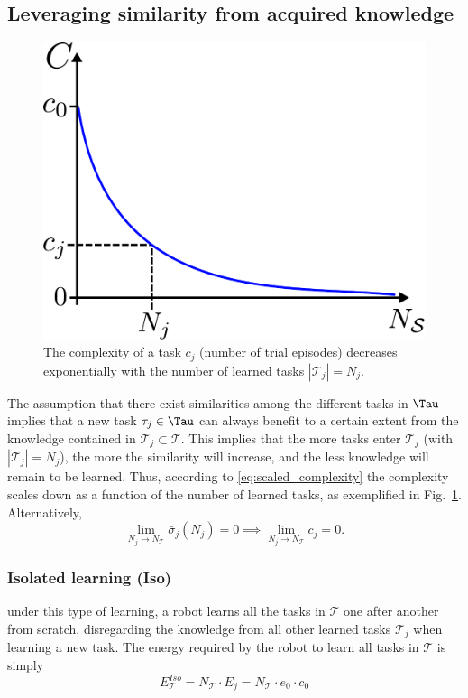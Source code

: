 \subsection{Leveraging similarity from acquired knowledge}
\begin{figure}[!t]
	\centering
	\includegraphics[width=0.7\columnwidth]{fig/complexity_per_cardinality.pdf}
	\caption{The complexity of a task $c_j$ (number of trial episodes) decreases exponentially with the number of learned tasks $|\mathcal{T}_j|=N_{j}$.}
	\label{fig:complexity_per_cardinality}
\end{figure}
The assumption that there exist similarities among the different tasks in $\Tau$ implies that a new task $\tau_j \in \Tau$ can always benefit to a certain extent from the knowledge contained in $\mathcal{T}_j \subset \mathcal{T}$. This implies that the more tasks enter $\mathcal{T}_j$ (with $|\mathcal{T}_j| = N_j$), the more the similarity will increase, and the less knowledge will remain to be learned. Thus, according to \eqref{eq:scaled_complexity} the complexity scales down as a function of the number of learned tasks, as exemplified in Fig.~\ref{fig:complexity_per_cardinality}. Alternatively,
\begin{equation}\label{eq:knowledge_limit2}
    \lim_{N_{j}\to N_{\mathcal{T}}} \bar{\sigma}_j(N_j) = 0 \implies \lim_{N_{j}\to N_{\mathcal{T}}} c_j = 0.
\end{equation}

\subsubsection{Isolated learning (Iso)} under this type of learning, a robot learns all the tasks in $\mathcal{T}$ one after another from scratch, disregarding the knowledge from all other learned tasks $\mathcal{T}_j$ when learning a new task. The energy required by the robot to learn all tasks in $\mathcal{T}$ is simply
\begin{equation}
  E^{Iso}_{\mathcal{T}} = N_{\mathcal{T}} \cdot E_j = N_{\mathcal{T}} \cdot e_{0} \cdot c_{0} %
\end{equation}

